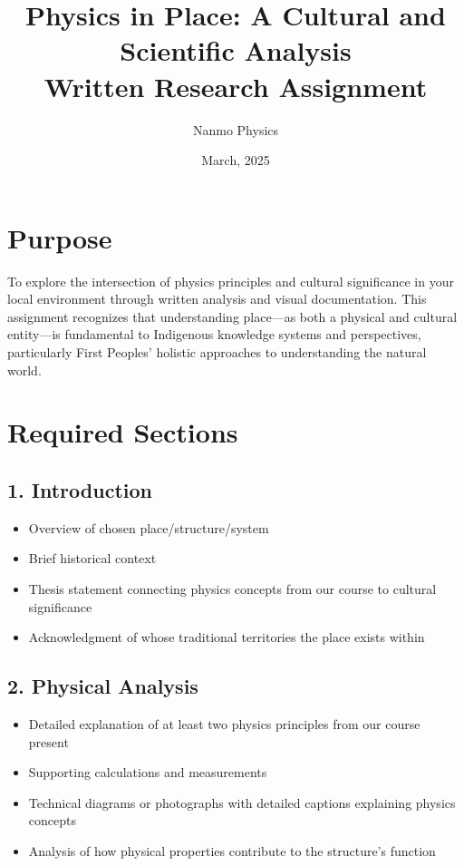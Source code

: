 \documentclass[12pt]{article}
\title{Physics in Place: A Cultural and Scientific Analysis\\
\large Written Research Assignment}
\author{Nanmo Physics}
\date{March, 2025}
\begin{document}
\maketitle

\section*{Purpose}
To explore the intersection of physics principles and cultural significance in your local environment through written analysis and visual documentation. This assignment recognizes that understanding place—as both a physical and cultural entity—is fundamental to Indigenous knowledge systems and perspectives, particularly First Peoples' holistic approaches to understanding the natural world.

\section*{Required Sections}

\subsection*{1. Introduction }
\begin{itemize}
    \item Overview of chosen place/structure/system
    \item Brief historical context
    \item Thesis statement connecting physics concepts from our course to cultural significance
    \item Acknowledgment of whose traditional territories the place exists within
\end{itemize}

\subsection*{2. Physical Analysis }
\begin{itemize}
    \item Detailed explanation of at least two physics principles from our course present
    \item Supporting calculations and measurements
    \item Technical diagrams or photographs with detailed captions explaining physics concepts
    \item Analysis of how physical properties contribute to the structure's function
\end{itemize}
\end{document}
